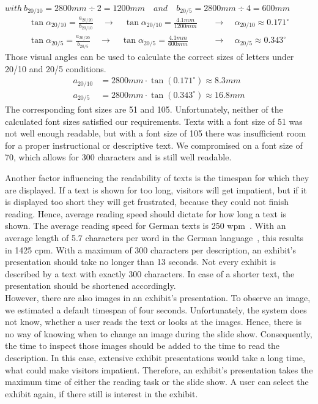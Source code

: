 \\
$with \ b_{20/10} = 2800mm \div 2 = 1200mm \quad and \quad b_{20/5} = 2800mm \div 4 = 600mm$
\begin{align*}
	\tan{\alpha_{20/10}} = \frac{a_{20/20}}{b_{20/10}} \quad \to \quad \tan{\alpha_{20/10}} = \frac{4.1mm}{1200mm} \quad &\to \quad \alpha_{20/10} \approx 0.171^\circ
\\
	\tan{\alpha_{20/5}} = \frac{a_{20/20}}{b_{20/5}} \quad \to \quad \tan{\alpha_{20/5}} = \frac{4.1mm}{600mm} \quad &\to \quad \alpha_{20/5} \approx 0.343^\circ
\end{align*}
Those visual angles can be used to calculate the correct sizes of letters under 20/10 and 20/5 conditions.
\begin{align*}
	a_{20/10} &= 2800mm \cdot \tan{(0.171^\circ)} \approx 8.3mm
	\\
	a_{20/5} &= 2800mm \cdot \tan{(0.343^\circ)} \approx 16.8mm
\end{align*}
The corresponding font sizes are 51 and 105. Unfortunately, neither of the calculated font sizes satisfied our requirements. Texts with a font size of 51 was not well enough readable, but with a font size of 105 there was insufficient room for a proper instructional or descriptive text. We compromised on a font size of 70, which allows for 300 characters and is still well readable.

Another factor influencing the readability of texts is the timespan for which they are displayed. If a text is shown for too long, visitors will get impatient, but if it is displayed too short they will get frustrated, because they could not finish reading. Hence, average reading speed should dictate for how long a text is shown. The average reading speed for German texts is 250 \ac{wpm}~\cite{Lesegeschwindigkeit}. With an average length of 5.7 characters per word in the German language~\cite{Wortlaenge}, this results in 1425 \ac{cpm}. With a maximum of 300 characters per description, an exhibit's presentation should take no longer than 13 seconds. Not every exhibit is described by a text with exactly 300 characters. In case of a shorter text, the presentation should be shortened accordingly. 
\\
However, there are also images in an exhibit's presentation. To observe an image, we estimated a default timespan of four seconds. Unfortunately, the system does not know, whether a user reads the text or looks at the images. Hence, there is no way of knowing when to change an image during the slide show. Consequently, the time to inspect those images should be added to the time to read the description. In this case, extensive exhibit presentations would take a long time, what could make visitors impatient. Therefore, an exhibit's presentation takes the maximum time of either the reading task or the slide show. A user can select the exhibit again, if there still is interest in the exhibit.

